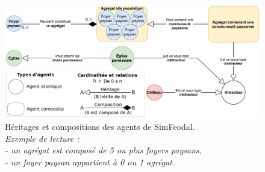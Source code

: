 \begin{figure}[H]
	\centering
	\includegraphics[width=\linewidth]{img/agents_constitution.pdf}
	\caption[Héritages et compositions des agents de SimFeodal.]{Héritages et compositions des agents de SimFeodal.\\
		\textit{Exemple de lecture :\\
			- un agrégat est composé de 5 ou plus foyers paysans,\\
			- un foyer paysan appartient à 0 ou 1 agrégat.}}
	\label{fig:constitution-agents}
\end{figure}


